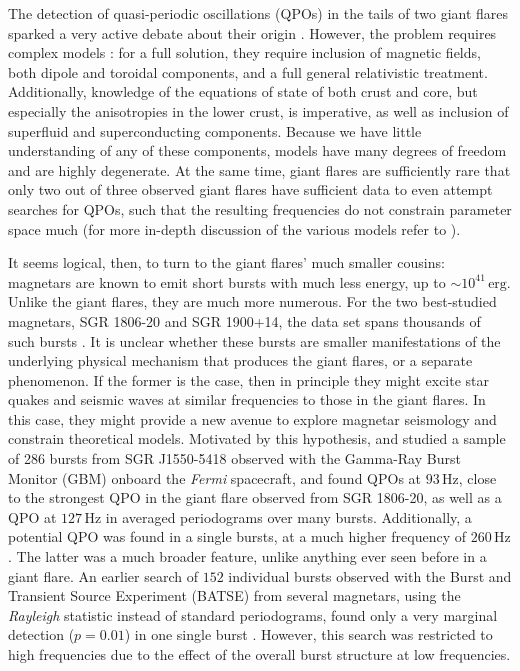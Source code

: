\documentclass[numberedappendix]{emulateapj}
\newcommand{\hz}{\,\mathrm{Hz}}
\begin{document}
The detection of quasi-periodic oscillations (QPOs) in the tails of two giant flares sparked a very active debate about their origin \citep{israel2005,strohmayer2005,strohmayer2006,watts2006}. However, the problem requires complex models \citep[for a general discussion, see ][]{watts2011}: for a full solution, they require inclusion of magnetic fields, both dipole and toroidal components, and a full general relativistic treatment. Additionally, knowledge of the equations of state of both crust and core, but especially the anisotropies in the lower crust, is imperative, as well as inclusion of superfluid and superconducting components. Because we have little understanding of any of these components, models have many degrees of freedom and are highly degenerate. At the same time, giant flares are sufficiently rare that only two out of three observed giant flares have sufficient data to even attempt searches for QPOs, such that the resulting frequencies do not constrain parameter space much (for more in-depth discussion of the various models refer to \citealp{samuelsson2007,andersson2009,sotani2007,sotani2008,vanhoven2008,vanhoven2011,vanhoven2012,colaiuda2011,colaiuda2012,gabler2011,gabler2012,gabler2013,passamonti2013a,passamonti2013b,lander2010,lander2011,glampedakis2006,glampedakis2014}).

It seems logical, then, to turn to the giant flares' much smaller cousins: magnetars are known to emit short bursts with much less energy, up to $\sim 10^{41} \, \mathrm{erg}$. Unlike the giant flares, they are much more numerous. For the two best-studied magnetars, SGR 1806-20 and SGR 1900+14, the data set spans thousands of such bursts \citep[e.g.][]{gogus1999,gogus2000,prieskorn2012}. It is unclear whether these bursts are smaller manifestations of the underlying physical mechanism that produces the giant flares, or a separate phenomenon. If the former is the case, then in principle they might excite star quakes and seismic waves at similar frequencies to those in the giant flares. In this case, they might provide a new avenue to explore magnetar seismology and constrain theoretical models. Motivated by this hypothesis, \citet{huppenkothen2013} and \citet{huppenkothen2014} studied a sample of 286 bursts from SGR J1550-5418 observed with the Gamma-Ray Burst Monitor (GBM) onboard the {\it Fermi} spacecraft, and found QPOs at $93 \hz$, close to the strongest QPO in the giant flare observed from SGR 1806-20, as well as a QPO at $127\hz$ in averaged periodograms over many bursts. Additionally, a potential QPO was found in a single bursts, at a much higher frequency of $260 \hz$. The latter was a much broader feature, unlike anything ever seen before in a giant flare.
An earlier search of $152$ individual bursts observed with the Burst and Transient Source Experiment (BATSE) from several magnetars, using the {\it Rayleigh} statistic instead of standard periodograms, found only a very marginal detection ($p = 0.01$) in one single burst \cite{kruger2002}. However, this search was restricted to high frequencies due to the effect of the overall burst structure at low frequencies.
\end{document}
